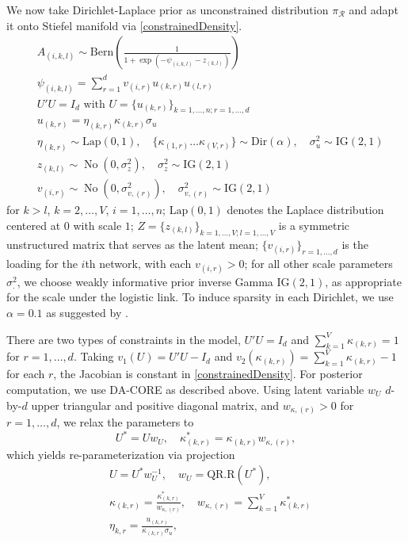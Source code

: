 \documentclass[10pt,fleqn]{article}
\newcommand{\mc}[1]{\mathcal{#1}}
\DeclareMathOperator{\No}{No}
\DeclareMathOperator{\1}{\mathbbm{1}}
\begin{document}
We now
take Dirichlet-Laplace prior \citep{bhattacharya2015dirichlet} as unconstrained distribution
$\pi_{\mc R}$ and adapt it onto Stiefel manifold via \eqref{constrainedDensity}.
   \begin{equation*}
   \begin{aligned}
   & A_{(i,k,l)} \sim \text{Bern}( \frac{1}{1+ \exp(-\psi_{(i,k,l)}- z_{(k,l)})})\\
   & \psi_{(i,k,l)} = \sum_{r=1}^{d}  v_{(i,r)} u_{(k,r)} u_{(l,r)}  \\
   & U'U=I_{d} \text{ with } U=\{u_{(k,r)}\}_{k=1,\ldots,n; r=1,\ldots,d}\\
           & u_{(k,r)}= \eta_{(k,r)}\kappa_{(k,r)}\sigma_{u} \\
   & \eta_{(k,r)}\sim \text{Lap}(0,1), \quad \{\kappa_{(1,r)}\ldots \kappa_{(V,r)}\} \sim \text{Dir}(\alpha),
    \quad \sigma^2_{u}\sim \text{IG}(2,1)\\   
   & z_{(k,l)} \sim \No(0,\sigma^2_z), \quad  \sigma^2_z \sim \text{IG}(2,1)
   \\
   & v_{(i,r)} \sim \No(0,\sigma^2_{v,(r)}), \quad  \sigma^2_{v,(r)} \sim \text{IG}(2,1)
   \end{aligned}
   \end{equation*}
   for $k>l$, $k=2,\ldots, V$, $i=1,\ldots,n$;  $\text{Lap}(0,1)$ denotes
   the Laplace distribution centered at $0$ with scale $1$; $Z=\{z_{(k,l)}\}_{k=1,\ldots,V;l=1,\ldots,V}$ is a symmetric unstructured matrix that serves as the latent mean; $\{ v_{(i,r)}\}_{r=1,\ldots,d}$
is the loading for the $i$th network, with each $v_{(i,r)}>0$; for all other scale parameters $\sigma^2_.$, we
choose weakly informative prior inverse Gamma $\text{IG}(2,1)$, as appropriate for the scale under the logistic link. To induce sparsity in each Dirichlet,
we use $\alpha=0.1$ as suggested by 
\cite{bhattacharya2015dirichlet}.

 
There are two types of constraints in the model,  $U'U=I_d$ and $\sum_{k=1}^V \kappa_{(k,r)}=1$ for $r=1,\ldots,d$. Taking $v_1(U)= U'U-I_d$ and $v_2(\kappa_{(k,r)})=\sum_{k=1}^V \kappa_{(k,r)}-1$ for each $r$, the Jacobian is  constant in \eqref{constrainedDensity}. For posterior computation, we use DA-CORE
as described above.
Using latent variable $w_U$ $d$-by-$d$ upper triangular and positive diagonal
matrix, and $w_{\kappa,{(r)}}>0$  for $r=1,\ldots ,d$, we relax the parameters
to
$$U^*=U w_U, \quad \kappa^*_{(k,r)}=\kappa_{(k,r)} w_{\kappa,{(r)}},$$
which yields re-parameterization via  projection
\begin{equation}
\begin{aligned}
& U=U^* w_U^{-1}, \quad  w_U=\text{QR.R}(U^*), \\
& \kappa_{(k,r)} = \frac{\kappa^*_{(k,r)}}{w_{\kappa,{(r)}}}, \quad  w_{\kappa,{(r)}}= \sum_{k=1}^V \kappa^*_{(k,r)}\\
& \eta_{k,r}= \frac{u_{(k,r)}}{\kappa_{(k,r)}\sigma_{u}},
\end{aligned}	
\end{equation}
\end{document}
